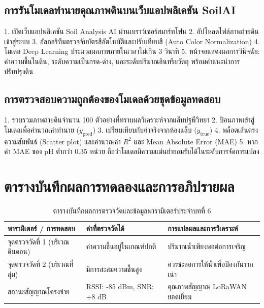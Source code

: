 \subsection{การรันโมเดลทำนายคุณภาพดินบนเว็บแอปพลิเคชัน SoilAI}
\begin{sensorbox}
1. เปิดเว็บแอปพลิเคชัน Soil Analysis AI ผ่านเบราว์เซอร์สมาร์ทโฟน
2. อัปโหลดไฟล์ภาพถ่ายดินเข้าสู่ระบบ
3. อัลกอริทึมตรวจจับบัตรสีอัตโนมัติและปรับเทียบสี (Auto Color Normalization)
4. โมเดล Deep Learning ประมวลผลภาพภายในเวลาไม่เกิน 3 วินาที
5. หน้าจอแสดงผลการวินิจฉัย: ค่าความชื้นในดิน, ระดับความเป็นกรด-ด่าง, และระดับปริมาณอินทรียวัตถุ พร้อมคำแนะนำการปรับปรุงดิน
\end{sensorbox}

\subsection{การตรวจสอบความถูกต้องของโมเดลด้วยชุดข้อมูลทดสอบ}
\begin{sensorbox}
1. รวบรวมภาพถ่ายดินจำนวน 100 ตัวอย่างที่ทราบผลวิเคราะห์จากแล็บปฐพีวิทยา
2. ป้อนภาพเข้าสู่โมเดลเพื่อคำนวณค่าทำนาย ($y_{\text{pred}}$)
3. เปรียบเทียบกับค่าจริงจากห้องแล็บ ($y_{\text{true}}$)
4. พล็อตเส้นตรงความสัมพันธ์ (Scatter plot) และคำนวณค่า $R^2$ และ Mean Absolute Error (MAE)
5. หากค่า MAE ของ pH ต่ำกว่า 0.35 หน่วย ถือว่าโมเดลมีความแม่นยำยอมรับได้ในระดับการจัดการแปลง
\end{sensorbox}

\section{ตารางบันทึกผลการทดลองและการอภิปรายผล}
\begin{table}[H]
\centering\small
\caption{ตารางบันทึกผลการตรวจวัดและข้อมูลพารามิเตอร์ประจำบทที่ 6}
\label{tab:ch06_datasheet}
\begin{tabularx}{\textwidth}{p{} p{} X}
\toprule
\textbf{พารามิเตอร์ / การทดสอบ} & \textbf{ค่าที่ตรวจวัดได้} & \textbf{การแปลผลและการวิเคราะห์} \\
\midrule
จุดตรวจวัดที่ 1 (บริเวณดินดอน) & ค่าความชื้นอยู่ในเกณฑ์ปกติ & ปริมาณน้ำเพียงพอต่อการเจริญ \\
จุดตรวจวัดที่ 2 (บริเวณที่ลุ่ม) & มีการสะสมความชื้นสูง & ควรชะลอการให้น้ำเพื่อป้องกันรากเน่า \\
สถานะสัญญาณโครงข่าย & RSSI: -85 dBm, SNR: +8 dB & คุณภาพสัญญาณ LoRaWAN ยอดเยี่ยม \\
\bottomrule
\end{tabularx}
\end{table}

